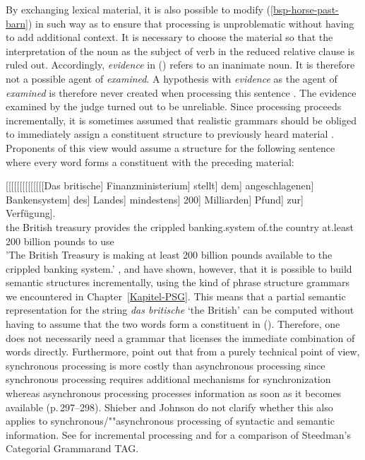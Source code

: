 \noindent
By exchanging lexical material, it is also possible to modify (\ref{bsp-horse-past-barn}) in such way as to
ensure that processing is unproblematic without having to add additional context. It is necessary
to choose the material so that the interpretation of the noun as the subject of verb in the reduced
relative clause is ruled out. Accordingly, \emph{evidence} in () refers to an inanimate noun.
It is therefore not a possible agent of \emph{examined}. A hypothesis with \emph{evidence} as the
agent of \emph{examined} is therefore never created when processing this sentence
\citep[]{SW2011a}.
\ea
The evidence examined by the judge turned out to be unreliable.
\z
\largerpage[2]
Since processing proceeds incrementally, it is sometimes assumed that realistic grammars should be obliged to immediately assign a constituent structure to previously heard
material \citep{AS82a,Steedman89b-u,Hausser92a-u}.
Proponents of this view would assume a structure for the following sentence where every word forms a constituent with the
preceding material:

\ea
\gll {}[[[[[[[[[[[[[[Das britische] Finanzministerium] stellt] dem] angeschlagenen] Bankensystem] des] Landes] mindestens] 200] Milliarden] Pfund] zur]~~~~~~~~~ Verfügung].\\
{}\spacebr{}\spacebr{}\spacebr{}\spacebr{}\spacebr{}\spacebr{}\spacebr{}\spacebr{}\spacebr{}\spacebr{}\spacebr{}\spacebr{}\spacebr{}\spacebr{}the British treasury provides the
crippled banking.system of.the country at.least 200 billion pounds to use\\
\glt 'The British Treasury is making at least 200 billion pounds available to the crippled banking system.'
\z
\citet{Pulman85a}, \citet{Stabler91a} and \citet[--308]{SJ93a} have shown, however, that it is possible to build semantic structures incrementally,
using the kind of phrase structure grammars we encountered in Chapter~\ref{Kapitel-PSG}. This means that a partial semantic representation for the
string \emph{das britische} `the British' can be computed without having to assume that the two words form a constituent in ().
Therefore, one does not necessarily need a grammar that licenses the immediate combination of words directly.
Furthermore,  point out that from a purely technical point of view, synchronous processing is more costly than asynchronous processing since
synchronous processing requires additional mechanisms for synchronization whereas asynchronous processing processes information as soon as it
becomes available (p.\,297--298). Shieber and Johnson do not clarify whether this also applies to synchronous/""asynchronous processing of syntactic and semantic
information. See  for incremental processing and for a comparison of Steedman's Categorial Grammar\indexcg and TAG\indextag.

